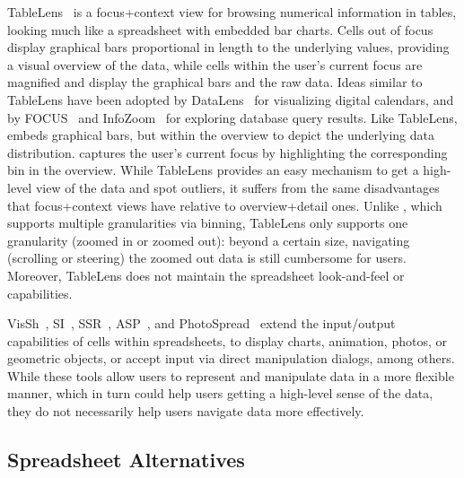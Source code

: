 TableLens~\cite{rao1994table}
is a focus+context view
for browsing numerical information
in tables, looking
much like a spreadsheet with embedded bar charts.
Cells out of focus display
graphical bars proportional in length
to the underlying values,
providing a visual overview of the data,
while cells within the user's current focus
are magnified and display the graphical bars and
the raw data.
Ideas similar to TableLens
have been adopted by DataLens~\cite{bederson2004datelens}
for visualizing digital calendars, and
by FOCUS~\cite{spenke1996focus}
and InfoZoom~\cite{spenke2003visualization}
for exploring database query results.
Like TableLens, \noah
embeds graphical bars, but within
the overview to depict the underlying data
distribution. \noah captures
the user's current focus by highlighting
the corresponding bin in the overview.
While TableLens provides an easy mechanism
to get a high-level view of the data
and spot outliers, it
suffers from the same disadvantages
that focus+context views have relative
to overview+detail ones.
Unlike \noah, which supports
multiple granularities via binning,
TableLens only supports
one granularity (zoomed in or
zoomed out): beyond
a certain size, navigating (scrolling or steering)
the zoomed out data
is still cumbersome for users. Moreover, TableLens does not maintain the spreadsheet look-and-feel or capabilities.


VisSh~\cite{nunez2000vissh}, SI~\cite{levoy1994spreadsheets},
SSR~\cite{chi1997spreadsheet}, ASP~\cite{piersol1986object},
and PhotoSpread~\cite{kandel2008photospread}
extend the input/output capabilities of cells
within spreadsheets, to
display charts, animation, photos, or geometric objects, or
accept input via direct manipulation dialogs,
among others.
While these tools allow users to represent and manipulate
data in a more flexible manner,
which in turn could help users getting a
high-level sense of the data,
they do not necessarily help users navigate data
more effectively.





\subsection{Spreadsheet Alternatives}

